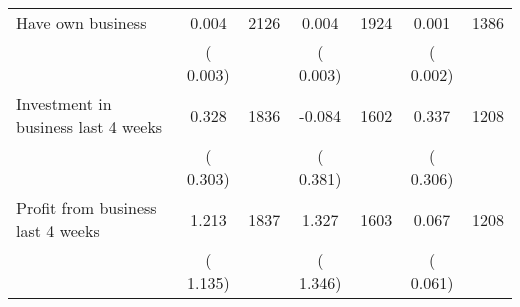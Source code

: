 \begin{tabular}{l*{6}{c}}
Have own business        &              0.004      &       2126       &              0.004      &       1924       &              0.001      &       1386       \\
                       &       (       0.003)            &                               &       (       0.003)            &                               &       (       0.002)            &                               \\
Investment in business last 4 weeks        &              0.328      &       1836       &             -0.084      &       1602       &              0.337      &       1208       \\
                       &       (       0.303)            &                               &       (       0.381)            &                               &       (       0.306)            &                               \\
Profit from business last 4 weeks        &              1.213      &       1837       &              1.327      &       1603       &              0.067      &       1208       \\
                       &       (       1.135)            &                               &       (       1.346)            &                               &       (       0.061)            &                               \\
\hline \end{tabular}